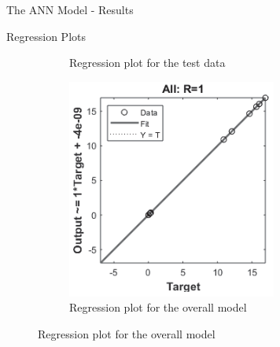 \documentclass{beamer}
\begin{document}
\begin{frame}{The ANN Model - Results}
\begin{block}{Regression Plots}
\begin{figure}
\begin{subfigure}[b]{0.23\textwidth}
             \caption{\centering Regression plot for the test data}
         \end{subfigure}
         \hfill
         \begin{subfigure}[b]{0.23\textwidth}
             \centering
             \includegraphics[width=\textwidth]{Figures/Regression-all.png}
             \caption{\centering Regression plot for the overall model}
         \end{subfigure}
    \end{figure}
    \end{block}
\end{frame}
\end{document}
